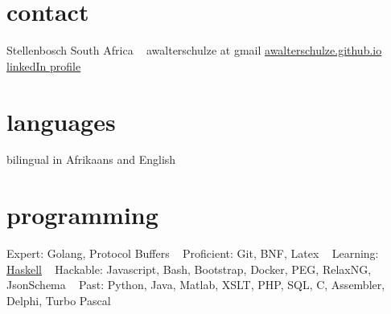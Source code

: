 \documentclass[print]{friggeri-cv} %
\begin{document}

\begin{aside} %
\section{contact}
Stellenbosch
South Africa
~
awalterschulze at gmail
\href{http://awalterschulze.github.io}{awalterschulze.github.io}
\href{https://za.linkedin.com/in/schulzewalter}{linkedIn profile}
\section{languages}
bilingual in Afrikaans and English
\section{programming}
%
Expert: 
Golang, Protocol Buffers
~
Proficient: 
Git, BNF, Latex
~
Learning: 
\href{https://trello.com/b/ij35amXZ/mylearninghaskell}{Haskell}
~
Hackable:
Javascript, Bash, Bootstrap, Docker, PEG, RelaxNG, JsonSchema
~
Past:
Python, Java, Matlab, XSLT, PHP, SQL, C, Assembler, Delphi, Turbo Pascal
\end{aside}
\end{document}
